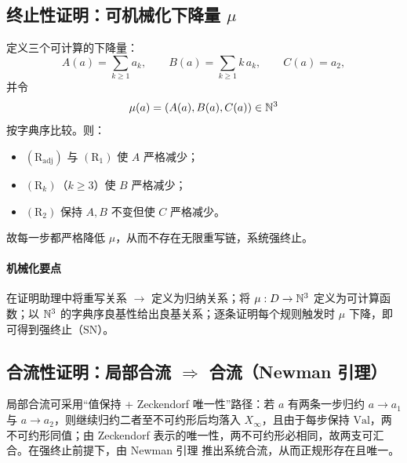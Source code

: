 \subsection{终止性证明：可机械化下降量 \texorpdfstring{$\mu$}{mu}}
定义三个可计算的下降量：
$$
A(a)=\sum_{k\ge 1}a_k,\qquad
B(a)=\sum_{k\ge 1}k\,a_k,\qquad
C(a)=a_2,
$$
并令
$$
\mu(a)=(A(a),B(a),C(a))\in\mathbb{N}^3
$$
按字典序比较。则：
\begin{itemize}
  \item $(\mathrm{R}_{\mathrm{adj}})$ 与 $(\mathrm{R}_1)$ 使 $A$ 严格减少；
  \item $(\mathrm{R}_k)$（$k\ge 3$）使 $B$ 严格减少；
  \item $(\mathrm{R}_2)$ 保持 $A,B$ 不变但使 $C$ 严格减少。
\end{itemize}
故每一步都严格降低 $\mu$，从而不存在无限重写链，系统强终止。

\paragraph{机械化要点} 在证明助理中将重写关系 $\to$ 定义为归纳关系；将 $\mu:D\to\mathbb{N}^3$ 定义为可计算函数；以 $\mathbb{N}^3$ 的字典序良基性给出良基关系；逐条证明每个规则触发时 $\mu$ 下降，即可得到强终止（$\mathrm{SN}$）。

\subsection{合流性证明：局部合流 \texorpdfstring{$\Rightarrow$}{->} 合流（Newman 引理）}
局部合流可采用“值保持 + Zeckendorf 唯一性”路径：若 $a$ 有两条一步归约 $a\to a_1$ 与 $a\to a_2$，则继续归约二者至不可约形后均落入 $X_\infty$，且由于每步保持 $\mathrm{Val}$，两不可约形同值；由 Zeckendorf 表示的唯一性，两不可约形必相同，故两支可汇合。在强终止前提下，由 Newman 引理 \cite{Newman1942} 推出系统合流，从而正规形存在且唯一。

